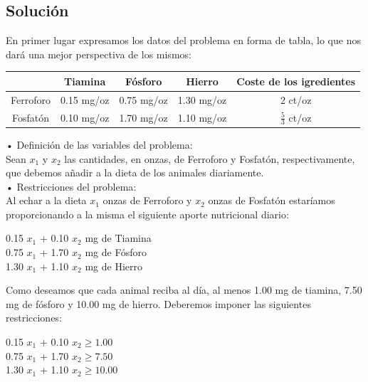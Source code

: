 \documentclass[a4,12pt]{article}
\begin{document}
\subsection{Solución}
En primer lugar expresamos los datos del problema en forma de tabla, lo que nos dará una mejor
perspectiva de los mismos:\\

\begin{center}
\begin{tabular}{|c|c|c|c|c|} \hline
\textbf{}   &  \textbf{Tiamina}  &  \textbf{Fósforo} &  \textbf{Hierro}  &  \textbf{Coste de los igredientes} \\ \hline
Ferroforo  & 0.15 mg/oz  &  0.75 mg/oz & 1.30 mg/oz  &  2 ct/oz  \\  \hline
Fosfatón  & 0.10 mg/oz  &  1.70 mg/oz & 1.10 mg/oz  &  $\frac{5}{3}$ ct/oz  \\  \hline
\end{tabular}
\end{center}

• Definición de las variables del problema:\\
Sean $x_1$ y $x_2$ las cantidades, en onzas, de Ferroforo y Fosfatón, respectivamente, que debemos añadir a la dieta de los animales diariamente.\\
• Restricciones del problema:\\
Al echar a la dieta $x_1$ onzas de Ferroforo y $x_2$ onzas de Fosfatón estaríamos proporcionando a la misma el siguiente aporte nutricional diario:\\

\begin{center}
                  0.15 $x_1$ + 0.10 $x_2$ mg de Tiamina\\
                  0.75 $x_1$ + 1.70 $x_2$ mg de Fósforo\\
                  1.30 $x_1$ + 1.10 $x_2$ mg de Hierro\\
\end{center}
                  
Como deseamos que cada animal reciba al día, al menos 1.00 mg de tiamina, 7.50 mg de fósforo y 10.00 mg de hierro. Deberemos imponer las siguientes restricciones:\\

\begin{center}
                  0.15 $x_1$ + 0.10 $x_2\ge 1.00$  \\
                  0.75 $x_1$ + 1.70 $x_2\ge 7.50$  \\
                  1.30 $x_1$ + 1.10 $x_2\ge 10.00$ \\
\end{center}
                  
\end{document}
